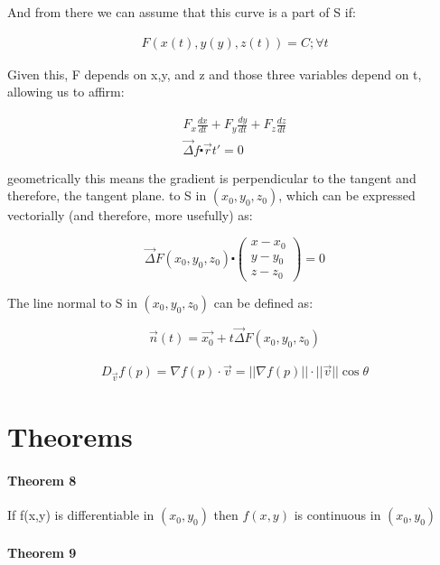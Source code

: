 \documentclass[11pt,fleqn]{book} %
\begin{document}
And from there we can assume that this curve is a part of S if:

\begin{gather}
    F(x(t), y(y), z(t)) = C ; \forall t
\end{gather}

Given this, F depends on x,y, and z and those three variables depend on t, allowing us
to affirm:

\begin{gather}
    F_x \frac{dx}{dt} + F_y \frac{dy}{dt} + F_z \frac{dz}{dt} \\
    \vec{\Delta} f \centerdot \vec{r}t' = 0
\end{gather}

geometrically this means the gradient is perpendicular to the tangent and therefore, the tangent plane.
to S in $(x_0,y_0,z_0)$, which can be expressed vectorially (and therefore, more usefully) as:

\begin{equation}
    \vec{\Delta}F(x_0,y_0,z_0) \centerdot \begin{pmatrix}
        x - x_0 \\ 
        y - y_0 \\ 
        z - z_0
    \end{pmatrix} = 0
\end{equation}

The line normal to S in $(x_0,y_0,z_0)$ can be defined as:

\begin{equation}
    \vec{n}(t) = \vec{x_0} + t\vec{\Delta} F(x_0,y_0,z_0)
\end{equation}

\begin{gather}
    D_{\vec{v}} f(p) = \nabla f(p) \cdot \vec{v} = ||\nabla f(p)|| \cdot ||\vec{v}|| \cos{\theta}
\end{gather}

\section{Theorems}

\paragraph{Theorem 8}

If f(x,y) is differentiable in $(x_0, y_0)$ then $f(x,y)$ is continuous in
$(x_0,y_0)$

\paragraph{Theorem 9}
\end{document}
